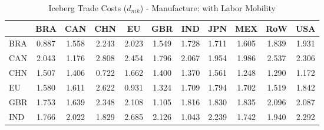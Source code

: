 \begin{table}[htbp]
\centering
\caption{Iceberg Trade Costs ($d_{nik}$) - Manufacture: with Labor Mobility} 
\label{tab:iceberg_Manufacture}
\begin{tabular}{lcccccccccc}
  \hline
 & BRA & CAN & CHN & EU & GBR & IND & JPN & MEX & RoW & USA \\ 
  \hline
BRA & \textcolor[RGB]{245,158,10}{0.887} & \textcolor[RGB]{176,114,79}{1.558} & \textcolor[RGB]{23,15,232}{2.243} & \textcolor[RGB]{56,36,199}{2.023} & \textcolor[RGB]{178,115,76}{1.549} & \textcolor[RGB]{133,86,122}{1.728} & \textcolor[RGB]{135,87,120}{1.711} & \textcolor[RGB]{166,107,89}{1.605} & \textcolor[RGB]{97,63,158}{1.839} & \textcolor[RGB]{77,50,178}{1.931} \\ 
  CAN & \textcolor[RGB]{54,35,201}{2.043} & \textcolor[RGB]{227,147,28}{1.176} & \textcolor[RGB]{0,0,255}{2.808} & \textcolor[RGB]{13,8,242}{2.454} & \textcolor[RGB]{115,74,140}{1.796} & \textcolor[RGB]{51,33,204}{2.067} & \textcolor[RGB]{66,43,189}{1.954} & \textcolor[RGB]{61,40,194}{1.986} & \textcolor[RGB]{10,7,245}{2.537} & \textcolor[RGB]{18,12,237}{2.306} \\ 
  CHN & \textcolor[RGB]{184,119,71}{1.507} & \textcolor[RGB]{199,129,56}{1.406} & \textcolor[RGB]{252,163,3}{0.722} & \textcolor[RGB]{150,97,105}{1.662} & \textcolor[RGB]{201,130,54}{1.400} & \textcolor[RGB]{204,132,51}{1.370} & \textcolor[RGB]{173,112,82}{1.561} & \textcolor[RGB]{219,142,36}{1.248} & \textcolor[RGB]{214,139,41}{1.290} & \textcolor[RGB]{230,148,26}{1.172} \\ 
  EU & \textcolor[RGB]{168,109,87}{1.580} & \textcolor[RGB]{163,106,92}{1.611} & \textcolor[RGB]{5,3,250}{2.622} & \textcolor[RGB]{242,157,13}{0.931} & \textcolor[RGB]{212,137,43}{1.324} & \textcolor[RGB]{138,89,117}{1.709} & \textcolor[RGB]{117,76,138}{1.794} & \textcolor[RGB]{143,92,112}{1.702} & \textcolor[RGB]{181,117,74}{1.519} & \textcolor[RGB]{94,61,161}{1.842} \\ 
  GBR & \textcolor[RGB]{128,82,128}{1.753} & \textcolor[RGB]{161,104,94}{1.639} & \textcolor[RGB]{15,10,240}{2.348} & \textcolor[RGB]{43,28,212}{2.108} & \textcolor[RGB]{235,152,20}{1.105} & \textcolor[RGB]{110,71,145}{1.816} & \textcolor[RGB]{102,66,153}{1.830} & \textcolor[RGB]{99,64,156}{1.835} & \textcolor[RGB]{46,30,209}{2.096} & \textcolor[RGB]{48,31,207}{2.087} \\ 
  IND & \textcolor[RGB]{122,79,133}{1.766} & \textcolor[RGB]{59,38,196}{2.022} & \textcolor[RGB]{105,68,150}{1.829} & \textcolor[RGB]{3,2,252}{2.685} & \textcolor[RGB]{41,26,214}{2.126} & \textcolor[RGB]{237,153,18}{1.043} & \textcolor[RGB]{25,16,230}{2.239} & \textcolor[RGB]{130,84,125}{1.742} & \textcolor[RGB]{71,46,184}{1.940} & \textcolor[RGB]{20,13,235}{2.292} \\ 

\end{tabular}
\end{table}
